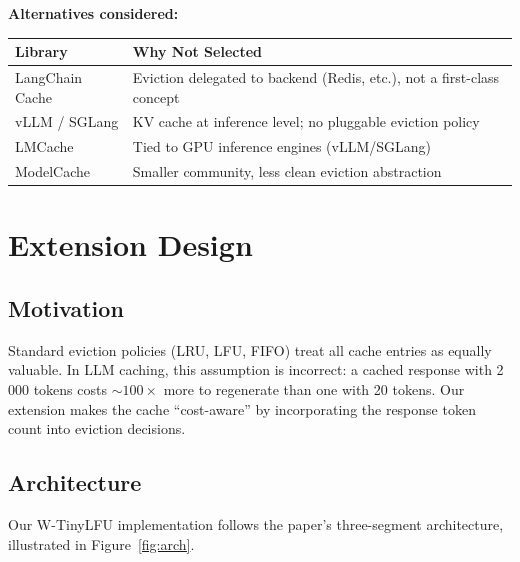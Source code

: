 \documentclass[11pt,a4paper]{article}
\begin{document}
\textbf{Alternatives considered:}
\begin{table}[H]
\centering
\small
\begin{tabular}{@{} l l @{}}
\toprule
\textbf{Library} & \textbf{Why Not Selected} \\
\midrule
LangChain Cache & Eviction delegated to backend (Redis, etc.), not a first-class concept \\
vLLM / SGLang & KV cache at inference level; no pluggable eviction policy \\
LMCache & Tied to GPU inference engines (vLLM/SGLang) \\
ModelCache & Smaller community, less clean eviction abstraction \\
\bottomrule
\end{tabular}
\end{table}

\section{Extension Design}

\subsection{Motivation}

Standard eviction policies (LRU, LFU, FIFO) treat all cache entries as equally valuable.
In LLM caching, this assumption is incorrect: a cached response with 2\,000 tokens costs ${\sim}100\times$ more to regenerate than one with 20 tokens.
Our extension makes the cache ``cost-aware'' by incorporating the response token count into eviction decisions.

\subsection{Architecture}

Our W-TinyLFU implementation follows the paper's three-segment architecture, illustrated in Figure~\ref{fig:arch}.
\end{document}
